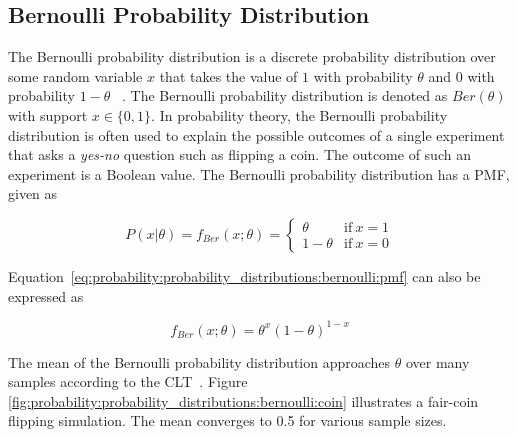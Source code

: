 \subsection{Bernoulli Probability Distribution}\label{sec:probability:probability_distributions:bernoulli}

The Bernoulli probability distribution is a discrete probability distribution over some random variable $x$ that takes the value of $1$ with probability $\theta$ and $0$ with probability $1-\theta$ ~\cite{ref:wackerly:2014}. The Bernoulli probability distribution is denoted as $Ber(\theta)$ with support $x \in \{0, 1\}$. In probability theory, the Bernoulli probability distribution is often used to explain the possible outcomes of a single experiment that asks a \textit{yes-no} question such as flipping a coin. The outcome of such an experiment is a Boolean value. The Bernoulli probability distribution has a \acs{PMF}, given as

\begin{equation}
      \label{eq:probability:probability_distributions:bernoulli:pmf}
      P(x \vert \theta) = f_{Ber}(x; \theta) =
      \begin{cases}
            \theta     & \text{if}\ x=1 \\
            1 - \theta & \text{if}\ x=0
      \end{cases}
\end{equation}

Equation~\eqref{eq:probability:probability_distributions:bernoulli:pmf} can also be expressed as

\begin{equation}
      \label{eq:probability:probability_distributions:bernoulli:alt}
      f_{Ber}(x; \theta) = \theta^{x}(1-\theta)^{1-x}
\end{equation}

The mean of the Bernoulli probability distribution approaches $\theta$ over many samples according to the \acs{CLT}~\cite{ref:grinstead:1997}. Figure \ref{fig:probability:probability_distributions:bernoulli:coin} illustrates a fair-coin flipping simulation. The mean converges to 0.5 for various sample sizes.


